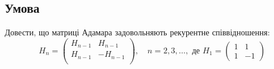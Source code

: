 \chapter{}
\label{chap:2}

\section{Умова}

Довести, що матриці Адамара задовольняють рекурентне співвідношення:
\begin{equation*}
    H_{n} = \begin{pmatrix}
        H_{n-1} &  H_{n-1} \\
        H_{n-1} & -H_{n-1} \\
    \end{pmatrix}, \quad n = 2, 3, \dots, \text{ де } 
        H_{1} = \begin{pmatrix} 1 & 1 \\ 1 & -1 \end{pmatrix}
\end{equation*}

